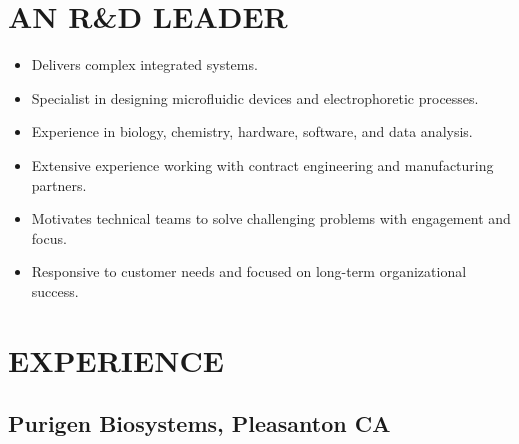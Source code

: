 \documentclass{res}
\begin{document}

\address{1125 Court Street \\ Alameda, CA 94538 \\ (650) 391-8463}

\address{Citizenship: United States \\ \\ lewis.a.marshall@gmail.com}

\begin{resume}

\section{AN R\&D LEADER}
  \begin{itemize}
    \item Delivers complex integrated systems.
    \item Specialist in designing microfluidic devices and electrophoretic processes.
    \item Experience in biology, chemistry, hardware, software, and data analysis.
    \item Extensive experience working with contract engineering and manufacturing partners.
    \item Motivates technical teams to solve challenging problems with engagement and focus.
    \item Responsive to customer needs and focused on long-term organizational success.
  \end{itemize}



\section{EXPERIENCE}
\vspace{-0.1in}

   \subsection{Purigen Biosystems, Pleasanton CA}
    \vspace{-0.1in}


\end{resume}
\end{document}
